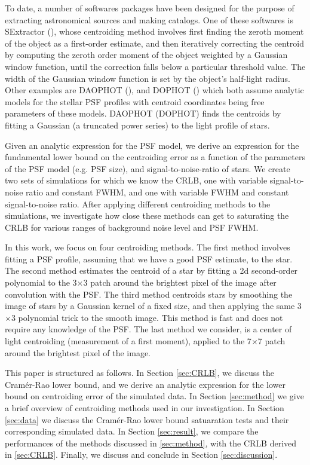 \documentclass[12pt, preprint]{aastex}
\begin{document}
To date, a number of softwares packages have been designed for the purpose of extracting astronomical
sources and making catalogs. One of these softwares is SExtractor (\citealt{sextractor}),
whose centroiding method involves first finding the zeroth moment of the object
as a first-order estimate, and then iteratively correcting the centroid by computing
the zeroth order moment of the object weighted by a Gaussian window function,
until the correction falls below a particular threshold value.
The width of the Gaussian window function is set by the object's half-light radius.
Other examples are DAOPHOT (\citealt{daophot}), and DOPHOT (\citealt{dophot})
which both assume analytic models for the stellar PSF profiles with centroid
coordinates being free parameters of these models.
DAOPHOT (DOPHOT) finds the centroids by fitting a Gaussian (a truncated power series) to 
the light profile of stars.

Given an analytic expression for the PSF model,
we derive an expression for the fundamental lower bound on the centroiding error as
a function of the parameters of the PSF model (e.g. PSF size),
and signal-to-noise-ratio of stars. We create two sets of simulations for which we 
know the CRLB, one with variable signal-to-noise ratio and constant FWHM, and one 
with variable FWHM and constant signal-to-noise ratio. After applying
different centroiding methods to the simulations,
we investigate how close these methods can get to saturating the CRLB for
various ranges of background noise level and PSF FWHM.

In this work, we focus on four centroiding methods. The first method
involves fitting a PSF profile, assuming that we have a good PSF estimate, to the star. 
The second method estimates the centroid of a star by fitting a 2d second-order polynomial to
 the 3$\times$3 patch around the brightest pixel of the image after convolution with the PSF. 
The third method centroids stars by
 smoothing the image of stars by a Gaussian kernel of a fixed size,
 and then applying the same 3$\times$3 polynomial trick to the smooth
 image. This method is fast and does not require any knowledge of the 
PSF. The last method we consider, is a center of light centroiding 
(measurement of a first moment), applied to the 
7$\times$7 patch around the brightest pixel of the image.

This paper is structured as follows. In Section \ref{sec:CRLB},
we discuss the Cram\'{e}r-Rao lower bound, and we derive
an analytic expression for the lower bound on centroiding error
of the simulated data. 
In Section \ref{sec:method} we give a brief overview of 
centroiding methods used in our investigation.
In Section \ref{sec:data} we discuss the Cram\'{e}r-Rao lower bound satuaration
tests and their corresponding simulated data.
In Section \ref{sec:result}, we compare the performances of the methods
discussed in \ref{sec:method}, with the CRLB derived in \ref{sec:CRLB}. Finally,
 we discuss and conclude in Section \ref{sec:discussion}.               
\end{document}
